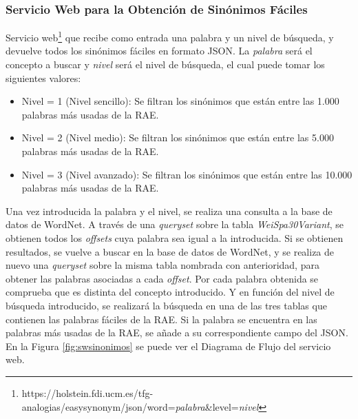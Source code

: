  


\subsubsection{Servicio Web para la Obtención de Sinónimos Fáciles}
\label{cap:subsec:sw_sinonimosfaciles}
Servicio web\footnote{https://holstein.fdi.ucm.es/tfg-analogias/easysynonym/json/word=\textit{palabra}\&level=\textit{nivel}} que recibe como entrada una palabra y un nivel de búsqueda, y devuelve todos los sinónimos fáciles en formato JSON. La \textit{palabra} será el concepto a buscar y \textit{nivel} será el nivel de búsqueda, el cual puede tomar los siguientes valores:
\begin{itemize}
	\item Nivel = 1 (Nivel sencillo): Se filtran los sinónimos que están entre las 1.000 palabras más usadas de la RAE.
	\item Nivel = 2 (Nivel medio): Se filtran los sinónimos que están entre las 5.000 palabras más usadas de la RAE.
	\item Nivel = 3 (Nivel avanzado): Se filtran los sinónimos que están entre las 10.000 palabras más usadas de la RAE.
\end{itemize}


Una vez introducida la palabra y el nivel, se realiza una consulta a la base de datos de WordNet. A través de una \textit{queryset} sobre la tabla \textit{WeiSpa30Variant}, se obtienen todos los \textit{offsets} cuya palabra sea igual a la introducida.
Si se obtienen resultados, se vuelve a buscar en la base de datos de WordNet, y se realiza de nuevo una \textit{queryset} sobre la misma tabla nombrada con anterioridad, para obtener las palabras asociadas a cada \textit{offset}. Por cada palabra obtenida  se comprueba que es distinta del concepto introducido. Y en función del nivel de búsqueda introducido, se realizará la búsqueda en una de las tres tablas que contienen las palabras fáciles de la RAE. Si la palabra se encuentra en las palabras más usadas de la RAE, se añade a su correspondiente campo del JSON. En la Figura \ref{fig:swsinonimos} se puede ver el Diagrama de Flujo del servicio web.

